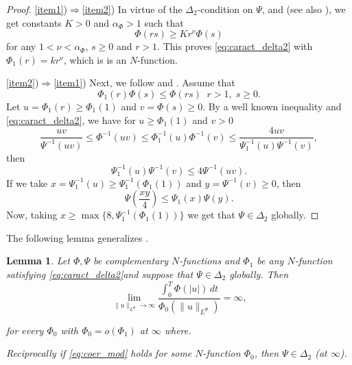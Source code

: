 \documentclass[twoside]{article}
\newtheorem{lem}[thm]{Lemma}
\theoremstyle{remark}
\newcommand{\orlnor}{\|_{L^{\Phi}}}
\renewcommand{\leq}{\leqslant}
\renewcommand{\geq}{\geqslant}
\begin{document}
\begin{proof}
\ref{item1})$\Rightarrow$\ref{item2})
In virtue of the $\Delta_2$-condition on $\Psi$, \cite[Thm. 11.7]{M} and \cite[Cor. 11.6]{M} (see also  \cite[Eq. (2.8)]{AGMS}), we get constants $K>0$ and $\alpha_{\Phi}>1$ such that
\begin{equation}\label{delta2-consecuencia}
\Phi(r s)\geq Kr^{\nu}\Phi(s)
\end{equation}
for any $1<\nu<\alpha_{\Phi}$,  $s\geq 0$ and $r>1$. This proves  \eqref{eq:caract_delta2} with $\Phi_1(r)=kr^\nu$, which is is an $N$-function.

\ref{item2})$\Rightarrow$\ref{item1})
Next, we follow  \cite[p. 32, Prop. 13]{rao1991theory} and \cite[p. 29, Prop. 9]{rao1991theory}.
Assume that 
\[
\Phi_1(r)\Phi(s)\leq \Phi(rs)\;\;r>1,\;s\geq 0.
\]
Let $u=\Phi_1(r)\geq \Phi_1(1)$ and $v=\Phi(s)\geq 0$. By a well known inequality \cite[p. 13, Prop. 1]{rao1991theory} and \eqref{eq:caract_delta2},  we have  for $u\geq \Phi_1(1)$ and $v> 0$
\[
\frac{uv}{\Psi^{-1}(uv)}\leq \Phi^{-1}(uv)\leq\Phi_1^{-1}(u)\Phi^{-1}(v)\leq
\frac{4uv}{\Psi_1^{-1}(u)\Psi^{-1}(v)},
\]
then 
\[
\Psi^{-1}_1(u)\Psi^{-1}(v)\leq 4 \Psi^{-1}(uv).
\]
If we take $x=\Psi^{-1}_1(u)\geq \Psi^{-1}_1(\Phi_1(1))$ and $y=\Psi^{-1}(v)\geq 0$, then 
\[
\Psi\left(\frac{xy}{4}\right)\leq \Psi_1(x)\Psi(y).
\]
Now, taking  $x\geq \max\{8,\Psi_1^{-1}(\Phi_1(1))\}$ we get that $\Psi \in \Delta_2$ globally.
\end{proof}

The following lemma generalizes \cite[Lemma 5.2]{ABGMS2015}.

\begin{lem}\label{lem_coer}
Let $\Phi,\Psi$ be complementary $N$-functions and  $\Phi_1$ be any $N$-function satisfying \eqref{eq:caract_delta2}and suppose that $\Psi \in \Delta_2$ globally. Then
\begin{equation}\label{eq:coer_mod}
\lim\limits_{\|u\orlnor\to \infty}
\frac{\int_0^T \Phi(|u|)\,dt}{\Phi_0(\|u\orlnor)}=\infty,
\end{equation}


for every $\Phi_0$ with $\Phi_0=o(\Phi_1)$ at $\infty$ where.

Reciprocally if  \eqref{eq:coer_mod} holds for some $N$-function $\Phi_0$,  then $\Psi\in\Delta_2$ (at $\infty$). 
\end{lem}
\end{document}
